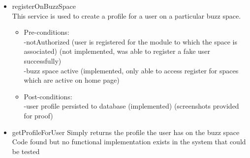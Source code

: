 \begin {itemize}
\begin {itemize}
\item {registerOnBuzzSpace}\\
This service is used to create a profile for a user on a particular buzz space.
\begin {itemize}
\item Pre-conditions: \\
-notAuthorized (user is registered for the module to which the space is associated) (not implemented, was able to register a fake user successfully)\\
        -buzz space active (implemented, only able to access register for spaces which are active on home page)\\
\item Post-conditions: \\
 -user profile persisted to database (implemented) (screenshots provided for proof)\\
\end{itemize}

\item{getProfileForUser}
Simply returns the profile the user has on the buzz space\\
Code found but no functional implementation exists in the system that could be tested \\
\end{itemize}

\end{itemize}
